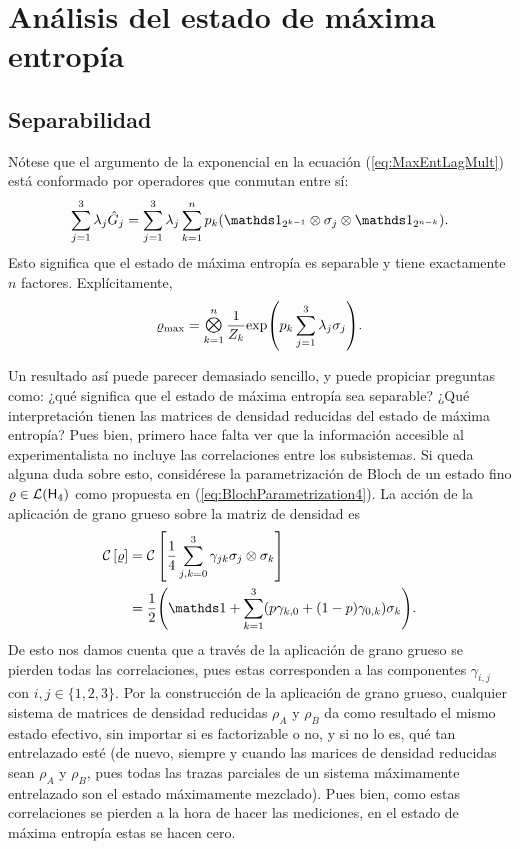 \section{Análisis del estado de máxima entropía}

\subsection{Separabilidad}

Nótese que el argumento de la exponencial en la ecuación (\ref{eq:MaxEntLagMult}) está conformado por operadores que conmutan entre sí:
\begin{equation}
    \sum_{j=1}^{3}\lambda_{j}\hat{G}_{j}=\sum_{j=1}^{3}\lambda_{j}\sum_{k=1}^{n}p_{k}(\Id_{2^{k-1}}\otimes\sigma_{j}\otimes\Id_{2^{n-k}}).\nonumber
\end{equation}
Esto significa que el estado de máxima entropía es separable y tiene exactamente $n$ factores. Explícitamente,
\begin{equation}\label{eq:MaxEntSeparable}
    \varrho_{\max}=\Motimes_{k=1}^{n}\frac{1}{Z_{k}}\text{exp}\qty(p_{k}\sum_{j=1}^{3}\lambda_{j}\sigma_{j}).
\end{equation}

Un resultado así puede parecer demasiado sencillo, y puede propiciar preguntas como: ¿qué significa que el estado de máxima entropía sea separable? ¿Qué interpretación tienen las matrices de densidad reducidas del estado de máxima entropía? Pues bien, primero hace falta ver que la información accesible al experimentalista no incluye las correlaciones entre los subsistemas. Si queda alguna duda sobre esto, considérese la parametrización de Bloch de un estado fino $\varrho\in\mathcal{L}({\sf H}_{4})$ como propuesta en (\ref{eq:BlochParametrization4}). La acción de la aplicación de grano grueso sobre la matriz de densidad es
\begin{align}
    \CG{\varrho}&=\CG{\frac{1}{4}\sum_{j,k=0}^{3}\gamma_{jk}\pauli{j}\otimes \pauli{k}}\nonumber\\
    &=\frac{1}{2}\qty(\Id+\sum_{k=1}^{3}(p\gamma_{k,0}+(1-p)\gamma_{0,k})\sigma_{k}).\nonumber
\end{align}
De esto nos damos cuenta que a través de la aplicación de grano grueso se pierden todas las correlaciones, pues estas corresponden a las componentes $\gamma_{i,j}$ con $i,j\in\{1,2,3\}$. Por la construcción de la aplicación de grano grueso, cualquier sistema de matrices de densidad reducidas $\rho_{A}$ y $\rho_{B}$ da como resultado el mismo estado efectivo, sin importar si es factorizable o no, y si no lo es, qué tan entrelazado esté (de nuevo, siempre y cuando las marices de densidad reducidas sean $\rho_{A}$ y $\rho_{B}$, pues todas las trazas parciales de un sistema máximamente entrelazado son el estado máximamente mezclado). Pues bien, como estas correlaciones se pierden a la hora de hacer las mediciones, en el estado de máxima entropía estas se hacen cero. 

